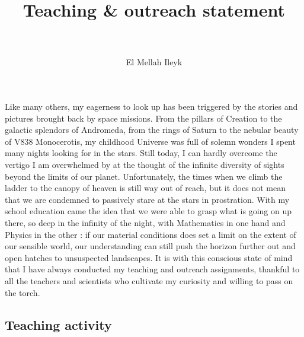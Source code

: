 \documentclass[a4paper,12pt,onecolumn]{article}
\title{	
\vspace*{-2cm}
\normalfont \tiny 
\horrule{0.5pt} \\[0.4cm] %
\huge Teaching \& outreach statement \\ %
\horrule{2pt} \\[0.5cm] %
}
\author{El Mellah Ileyk} %
\date{\tiny }%
\begin{document}


\maketitle
\thispagestyle{empty}

Like many others, my eagerness to look up has been triggered by the stories and pictures brought back by space missions. From the pillars of Creation to the galactic splendors of Andromeda, from the rings of Saturn to the nebular beauty of V838 Monocerotis, my childhood Universe was full of solemn wonders I spent many nights looking for in the stars. Still today, I can hardly overcome the vertigo I am overwhelmed by at the thought of the infinite diversity of sights beyond the limits of our planet. Unfortunately, the times when we climb the ladder to the canopy of heaven is still way out of reach, but it does not mean that we are condemned to passively stare at the stars in prostration. With my school education came the idea that we were able to grasp what is going on up there, so deep in the infinity of the night, with Mathematics in one hand and Physics in the other : if our material conditions does set a limit on the extent of our sensible world, our understanding can still push the horizon further out and open hatches to unsuspected landscapes. It is with this conscious state of mind that I have always conducted my teaching and outreach assignments, thankful to all the teachers and scientists who cultivate my curiosity and willing to pass on the torch.

%
%
%

\subsection*{Teaching activity}

\end{document}
